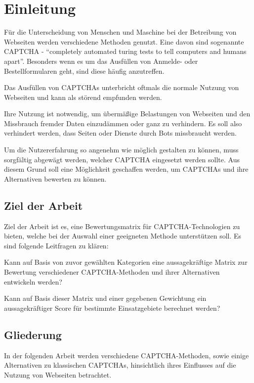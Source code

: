 \chapter{Einleitung}
\label{ch:intro}

Für die Unterscheidung von Menschen und Maschine bei der Betreibung von Webseiten werden verschiedene Methoden genutzt.
Eine davon sind sogenannte CAPTCHA - ``completely automated turing tests to tell computers and humans apart''.
Besonders wenn es um das Ausfüllen von Anmelde- oder Bestellformularen geht, sind diese häufig anzutreffen.

Das Ausfüllen von CAPTCHAs unterbricht oftmals die normale Nutzung von Webseiten und kann als störend empfunden werden.

Ihre Nutzung ist notwendig, um übermäßige Belastungen von Webseiten und den Missbrauch fremder Daten einzudämmen oder ganz zu verhindern.
Es soll also verhindert werden, dass Seiten oder Dienste durch Bots missbraucht werden.

Um die Nutzererfahrung so angenehm wie möglich gestalten zu können,
muss sorgfältig abgewägt werden, welcher CAPTCHA eingesetzt werden sollte. 
Aus diesem Grund soll eine Möglichkeit geschaffen werden, um CAPTCHAs und ihre Alternativen bewerten zu können.


%
%
\section{Ziel der Arbeit}
\label{sec:intro:goal}

Ziel der Arbeit ist es, eine Bewertungsmatrix für CAPTCHA-Technologien zu bieten, welche bei der Auswahl einer geeigneten Methode unterstützen soll.
Es sind folgende Leitfragen zu klären:

Kann auf Basis von zuvor gewählten Kategorien eine aussagekräftige Matrix zur
Bewertung verschiedener CAPTCHA-Methoden und ihrer Alternativen entwickeln werden?

Kann auf Basis dieser Matrix und einer gegebenen Gewichtung
ein aussagekräftiger Score für bestimmte Einsatzgebiete berechnet werden?

%
%
\section{Gliederung}
\label{sec:intro:structure}
In der folgenden Arbeit werden verschiedene CAPTCHA-Methoden, sowie einige Alternativen zu klassischen CAPTCHAs,
hinsichtlich ihres Einflusses auf die Nutzung von Webseiten betrachtet.

